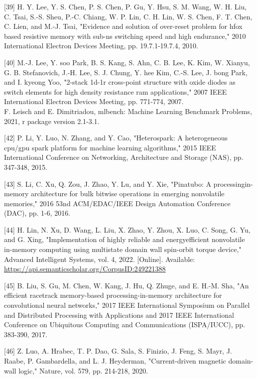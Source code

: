 \documentclass[10pt]{article}
\begin{document}
[39] H. Y. Lee, Y. S. Chen, P. S. Chen, P. Gu, Y. Hsu, S. M. Wang, W. H. Liu, C. Tsai, S.-S. Sheu, P.-C. Chiang, W. P. Lin, C. H. Lin, W. S. Chen, F. T. Chen, C. Lien, and M.-J. Tsai, "Evidence and solution of over-reset problem for hfox based resistive memory with sub-ns switching speed and high endurance," 2010 International Electron Devices Meeting, pp. 19.7.1-19.7.4, 2010.

[40] M.-J. Lee, Y. soo Park, B. S. Kang, S. Ahn, C. B. Lee, K. Kim, W. Xianyu, G. B. Stefanovich, J.-H. Lee, S. J. Chung, Y. hee Kim, C.-S. Lee, J. bong Park, and I. kyeong Yoo, "2-stack 1d-1r cross-point structure with oxide diodes as switch elements for high density resistance ram applications," 2007 IEEE International Electron Devices Meeting, pp. 771-774, 2007.\\
[41] F. Leisch and E. Dimitriadou, mlbench: Machine Learning Benchmark Problems, 2021, r package version 2.1-3.1.

[42] P. Li, Y. Luo, N. Zhang, and Y. Cao, "Heterospark: A heterogeneous cpu/gpu spark platform for machine learning algorithms," 2015 IEEE International Conference on Networking, Architecture and Storage (NAS), pp. 347-348, 2015.

[43] S. Li, C. Xu, Q. Zou, J. Zhao, Y. Lu, and Y. Xie, "Pinatubo: A processingin-memory architecture for bulk bitwise operations in emerging nonvolatile memories," 2016 53nd ACM/EDAC/IEEE Design Automation Conference (DAC), pp. 1-6, 2016.

[44] H. Lin, N. Xu, D. Wang, L. Liu, X. Zhao, Y. Zhou, X. Luo, C. Song, G. Yu, and G. Xing, "Implementation of highly reliable and energyefficient nonvolatile in-memory computing using multistate domain wall spin-orbit torque device," Advanced Intelligent Systems, vol. 4, 2022. [Online]. Available: \href{https://api.semanticscholar.org/CorpusID:249221388}{https://api.semanticscholar.org/CorpusID:249221388}

[45] B. Liu, S. Gu, M. Chen, W. Kang, J. Hu, Q. Zhuge, and E. H.-M. Sha, "An efficient racetrack memory-based processing-in-memory architecture for convolutional neural networks," 2017 IEEE International Symposium on Parallel and Distributed Processing with Applications and 2017 IEEE International Conference on Ubiquitous Computing and Communications (ISPA/IUCC), pp. 383-390, 2017.

[46] Z. Luo, A. Hrabec, T. P. Dao, G. Sala, S. Finizio, J. Feng, S. Mayr, J. Raabe, P. Gambardella, and L. J. Heyderman, "Current-driven magnetic domain-wall logic," Nature, vol. 579, pp. 214-218, 2020.
\end{document}
